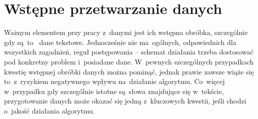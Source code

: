 \documentclass{praca1}
\begin{document}
\section{Wstępne przetwarzanie danych}

Ważnym elementem przy pracy z~danymi jest ich wstępna obróbka, szczególnie gdy są~to~	dane tekstowe. Jednocześnie nie ma~ogólnych, odpowiednich dla wszystkich zagadnień, reguł postępowania -- schemat działania trzeba dostosować pod konkretny problem i~posiadane dane. W~pewnych szczególnych przypadkach kwestię wstępnej obróbki danych można pominąć, jednak prawie zawsze wiąże się to~z~ryzykiem negatywnego wpływu na~działanie algorytmu. Co~więcej w~przypadku gdy szczególnie istotne są~słowa znajdujące się w~tekście, przygotowanie danych może okazać się jedną z~kluczowych kwestii, jeśli chodzi o~jakość działania algorytmu.
\end{document}
